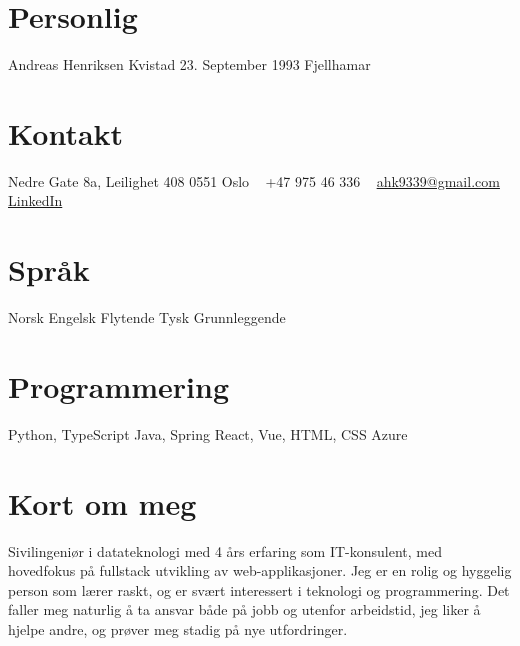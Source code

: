 \documentclass[]{friggeri-cv} %
\begin{document}


\begin{aside} %
\section{Personlig}
Andreas Henriksen Kvistad
23. September 1993
Fjellhamar
\section{Kontakt}
Nedre Gate 8a, Leilighet 408
0551 Oslo
~
+47 975 46 336
~
\href{mailto:ahk9339@gmail.com}{ahk9339@gmail.com}
\href{https://no.linkedin.com/in/andreas-kvistad-5b7ba6127}{LinkedIn}
\section{Språk}
Norsk
Engelsk Flytende
Tysk Grunnleggende
\section{Programmering}
Python, TypeScript
Java, Spring
React, Vue, HTML, CSS
Azure
\end{aside}



\section{Kort om meg}
Sivilingeniør i datateknologi med 4 års erfaring som IT-konsulent, med hovedfokus på fullstack utvikling av web-applikasjoner. Jeg er en rolig og hyggelig person som lærer raskt, og er svært interessert i teknologi og programmering. Det faller meg naturlig å ta ansvar både på jobb og utenfor arbeidstid, jeg liker å hjelpe andre, og prøver meg stadig på nye utfordringer. 


\end{document}

